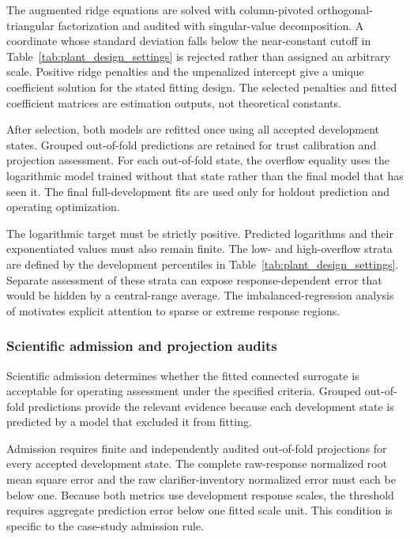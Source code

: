 The augmented ridge equations are solved with column-pivoted orthogonal-triangular factorization and audited with singular-value decomposition. A coordinate whose standard deviation falls below the near-constant cutoff in Table~\ref{tab:plant_design_settings} is rejected rather than assigned an arbitrary scale. Positive ridge penalties and the unpenalized intercept give a unique coefficient solution for the stated fitting design. The selected penalties and fitted coefficient matrices are estimation outputs, not theoretical constants.

After selection, both models are refitted once using all accepted development states. Grouped out-of-fold predictions are retained for trust calibration and projection assessment. For each out-of-fold state, the overflow equality uses the logarithmic model trained without that state rather than the final model that has seen it. The final full-development fits are used only for holdout prediction and operating optimization.

The logarithmic target must be strictly positive. Predicted logarithms and their exponentiated values must also remain finite. The low- and high-overflow strata are defined by the development percentiles in Table~\ref{tab:plant_design_settings}. Separate assessment of these strata can expose response-dependent error that would be hidden by a central-range average. The imbalanced-regression analysis of \citet{Shahbazi2026} motivates explicit attention to sparse or extreme response regions.

\subsubsection{Scientific admission and projection audits}

Scientific admission determines whether the fitted connected surrogate is acceptable for operating assessment under the specified criteria. Grouped out-of-fold predictions provide the relevant evidence because each development state is predicted by a model that excluded it from fitting.

Admission requires finite and independently audited out-of-fold projections for every accepted development state. The complete raw-response normalized root mean square error and the raw clarifier-inventory normalized error must each be below one. Because both metrics use development response scales, the threshold requires aggregate prediction error below one fitted scale unit. This condition is specific to the case-study admission rule.

